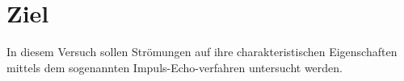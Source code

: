 \section{Ziel}
\label{sec:Ziel}

In diesem Versuch sollen Strömungen auf ihre charakteristischen Eigenschaften
mittels dem sogenannten Impuls-Echo-verfahren untersucht werden.